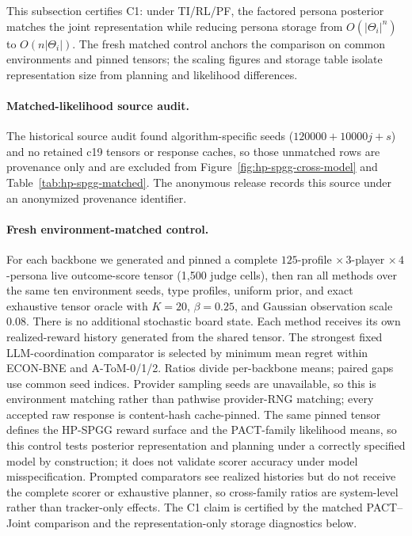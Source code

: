 This subsection certifies C1: under TI/RL/PF, the factored persona posterior matches the joint representation while reducing persona storage from $O(|\Theta_i|^n)$ to $O(n|\Theta_i|)$. The fresh matched control anchors the comparison on common environments and pinned tensors; the scaling figures and storage table isolate representation size from planning and likelihood differences.

\paragraph{Matched-likelihood source audit.}
\label{app:matched-likelihood-audit}
The historical source audit found algorithm-specific seeds ($120000+10000j+s$) and no retained c19 tensors or response caches, so those unmatched rows are provenance only and are excluded from Figure~\ref{fig:hp-spgg-cross-model} and Table~\ref{tab:hp-spgg-matched}. The anonymous release records this source under an anonymized provenance identifier.

\paragraph{Fresh environment-matched control.}
For each backbone we generated and pinned a complete $125$-profile ${\times}\,3$-player ${\times}\,4$-persona live outcome-score tensor (1,500 judge cells), then ran all methods over the same ten environment seeds, type profiles, uniform prior, and exact exhaustive tensor oracle with $K{=}20$, $\beta{=}0.25$, and Gaussian observation scale $0.08$. There is no additional stochastic board state. Each method receives its own realized-reward history generated from the shared tensor. The strongest fixed LLM-coordination comparator is selected by minimum mean regret within ECON-BNE and A-ToM-0/1/2. Ratios divide per-backbone means; paired gaps use common seed indices. Provider sampling seeds are unavailable, so this is environment matching rather than pathwise provider-RNG matching; every accepted raw response is content-hash cache-pinned. The same pinned tensor defines the HP-SPGG reward surface and the PACT-family likelihood means, so this control tests posterior representation and planning under a correctly specified model by construction; it does not validate scorer accuracy under model misspecification. Prompted comparators see realized histories but do not receive the complete scorer or exhaustive planner, so cross-family ratios are system-level rather than tracker-only effects. The C1 claim is certified by the matched PACT--Joint comparison and the representation-only storage diagnostics below.

